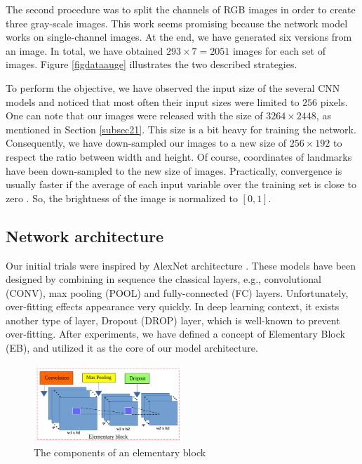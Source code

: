 \documentclass[review]{elsarticle}
\begin{document}
The second procedure was to split the channels of RGB images in order to create three gray-scale images. This work seems promising because the network model works on single-channel images. At the end, we have generated six versions from an image. In total, we have obtained $293 \times 7 = 2051$ images for each set of images. Figure \ref{figdataauge} illustrates the two described strategies.

To perform the objective, we have observed the input size of the several CNN models \cite{krizhevsky2012imagenet, ciregan2012multi, cintas2016automatic, sun2013deep} and noticed that most often their input sizes were limited to $256$ pixels. One can note that our images were released with the size of $3264 \times 2448$, as mentioned in Section \ref{subsec21}. This size is a bit heavy for training the network. Consequently, we have down-sampled our images to a new size of $256 \times 192$ to respect the ratio between width and height. Of course, coordinates of landmarks have been down-sampled to the new size of images. Practically, convergence is usually faster if the average of each input variable over the training set is close to zero \cite{lecun2012efficient}. So, the brightness of the image is normalized to $[0,1]$.%

\subsection{Network architecture}
\label{subsec22}
Our initial trials were inspired by AlexNet architecture \cite{krizhevsky2012imagenet}. These models have been designed by combining in sequence the classical layers, e.g., convolutional (CONV), max pooling (POOL) and fully-connected (FC) layers. Unfortunately, over-fitting effects appearance very quickly. In deep learning context, it exists another type of layer, Dropout (DROP) layer, which is well-known to prevent over-fitting. After experiments, we have defined a concept of Elementary Block (EB), and utilized it as the core of our model architecture.

\begin{figure}[h!]
	\centering
	\includegraphics[width=0.5\textwidth]{images/eblock}
	\caption{The components of an elementary block}
	\label{figeblock}
\end{figure}
\end{document}
